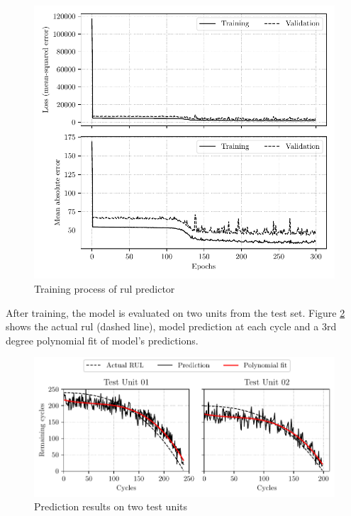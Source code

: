 \begin{figure}[H]
    \centering
    \includegraphics{figures/cmapss_regression_training.pdf}
    \caption{Training process of \acrshort{rul} predictor}
    \label{fig:cmapss-regression-training}
\end{figure}

After training, the model is evaluated on two units from the test set. Figure \ref{fig:cmapss-regression-prediction} shows the actual \acrshort{rul} (dashed line), model prediction at each cycle and a 3rd degree polynomial fit of model's predictions.

\begin{figure}[H]
    \centering
    \includegraphics{figures/cmapss_regression_predictions.pdf}
    \caption{Prediction results on two test units}
    \label{fig:cmapss-regression-prediction}
\end{figure}

